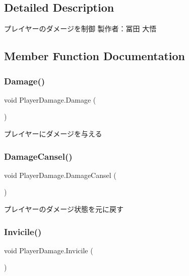 \subsection{Detailed Description}
プレイヤーのダメージを制御 製作者：冨田 大悟 



\subsection{Member Function Documentation}
\mbox{\label{class_player_damage_ada1f62dd6ab0c1b7888f7154f8bcb2ba}} 
\subsubsection{\texorpdfstring{Damage()}{Damage()}}
{\footnotesize\ttfamily void Player\+Damage.\+Damage (\begin{DoxyParamCaption}{ }\end{DoxyParamCaption})\hspace{0.3cm}{\ttfamily [inline]}}



プレイヤーにダメージを与える 

\mbox{\label{class_player_damage_a79eb4af6729d0340caf7725e4121f886}} 
\subsubsection{\texorpdfstring{Damage\+Cansel()}{DamageCansel()}}
{\footnotesize\ttfamily void Player\+Damage.\+Damage\+Cansel (\begin{DoxyParamCaption}{ }\end{DoxyParamCaption})\hspace{0.3cm}{\ttfamily [inline]}}



プレイヤーのダメージ状態を元に戻す 

\mbox{\label{class_player_damage_a4702eb72b4be3f5bd35861c5ed45a376}} 
\subsubsection{\texorpdfstring{Invicile()}{Invicile()}}
{\footnotesize\ttfamily void Player\+Damage.\+Invicile (\begin{DoxyParamCaption}{ }\end{DoxyParamCaption})\hspace{0.3cm}{\ttfamily [inline]}}



